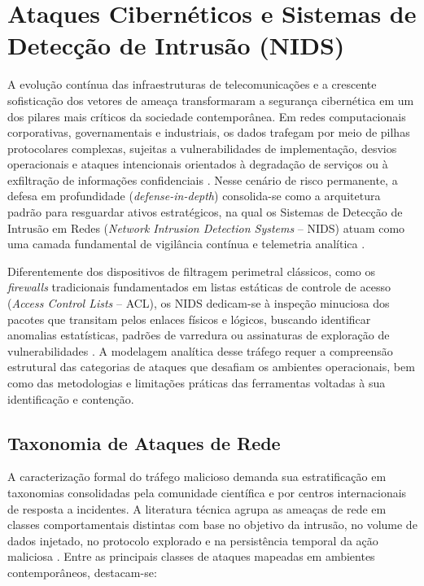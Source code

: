 \section{Ataques Cibernéticos e Sistemas de Detecção de Intrusão (NIDS)}
\label{sec:ataques_e_nids}

A evolução contínua das infraestruturas de telecomunicações e a crescente sofisticação dos vetores de ameaça transformaram a segurança cibernética em um dos pilares mais críticos da sociedade contemporânea. Em redes computacionais corporativas, governamentais e industriais, os dados trafegam por meio de pilhas protocolares complexas, sujeitas a vulnerabilidades de implementação, desvios operacionais e ataques intencionais orientados à degradação de serviços ou à exfiltração de informações confidenciais \cite{cyberrisk2025, aiimpact2026}. Nesse cenário de risco permanente, a defesa em profundidade (\emph{defense-in-depth}) consolida-se como a arquitetura padrão para resguardar ativos estratégicos, na qual os Sistemas de Detecção de Intrusão em Redes (\emph{Network Intrusion Detection Systems} -- NIDS) atuam como uma camada fundamental de vigilância contínua e telemetria analítica \cite{advancedids2024, p4nids2025}.

Diferentemente dos dispositivos de filtragem perimetral clássicos, como os \emph{firewalls} tradicionais fundamentados em listas estáticas de controle de acesso (\emph{Access Control Lists} -- ACL), os NIDS dedicam-se à inspeção minuciosa dos pacotes que transitam pelos enlaces físicos e lógicos, buscando identificar anomalias estatísticas, padrões de varredura ou assinaturas de exploração de vulnerabilidades \cite{standard2021}. A modelagem analítica desse tráfego requer a compreensão estrutural das categorias de ataques que desafiam os ambientes operacionais, bem como das metodologias e limitações práticas das ferramentas voltadas à sua identificação e contenção.

\subsection{Taxonomia de Ataques de Rede}
\label{subsec:taxonomia_ataques}

A caracterização formal do tráfego malicioso demanda sua estratificação em taxonomias consolidadas pela comunidade científica e por centros internacionais de resposta a incidentes. A literatura técnica agrupa as ameaças de rede em classes comportamentais distintas com base no objetivo da intrusão, no volume de dados injetado, no protocolo explorado e na persistência temporal da ação maliciosa \cite{Sharafaldin2018TowardGA, standard2021, ciciot2023}. Entre as principais classes de ataques mapeadas em ambientes contemporâneos, destacam-se:

